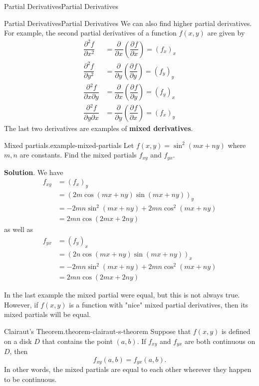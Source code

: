 \documentclass[10pt,]{book}
\newcommand{\terminology}[1]{\textbf{#1}}
\numberwithin{equation}{section}
\newcommand{\pdv}[3][]{\dfrac{\partial^{#1} #2}{\partial #3^{#1}}}
\begin{document}
\begin{chapterptx}{Partial Derivatives}{}{Partial Derivatives}{}{}
\begin{sectionptx}{Partial Derivatives}{}{Partial Derivatives}{}{}
We can also find higher partial derivatives. For example, the second partial derivatives of a function \(f(x,y)\) are given by%
\begin{align*}
\pdv[2]{f}{x} & = \pdv{}{x}\left(\pdv{f}{x}\right) = (f_{x})_{x} \\
\pdv[2]{f}{y} & = \pdv{}{y}\left(\pdv{f}{y}\right) = (f_{y})_{y} \\
\pdv{{}^{2}f}{x\partial y} & = \pdv{}{x}\left(\pdv{f}{y}\right) = (f_{y})_{x} \\
\pdv{{}^{2}f}{y\partial x} & = \pdv{}{y}\left(\pdv{f}{x}\right) = (f_{x})_{y} 
\end{align*}
The last two derivatives are examples of \terminology{mixed derivatives}.%
\begin{example}{Mixed partials.}{example-mixed-partials}%
\hypertarget{p-1145}{}%
Let \(f(x,y) = \sin^{2}(mx+ny)\) where \(m,n\) are constants. Find the mixed partials \(f_{xy}\) and \(f_{yx}\).%
\par\smallskip%
\noindent\textbf{Solution}.\hypertarget{solution-177}{}\quad%
\hypertarget{p-1146}{}%
We have%
\begin{align*}
f_{xy} & = (f_{x})_{y} \\
& = (2m\cos(mx+ny)\sin(mx+ny))_{y} \\
& = -2mn\sin^{2}(mx+ny) + 2mn\cos^{2}(mx+ny) \\
& = 2mn\cos(2mx+2ny) 
\end{align*}
as well as%
\begin{align*}
f_{yx} & = (f_{y})_{x} \\
& = (2n\cos(mx+ny)\sin(mx+ny))_{x} \\
& = -2mn\sin^{2}(mx+ny) + 2mn\cos^{2}(mx+ny) \\
& = 2mn\cos(2mx+2ny) 
\end{align*}
%
\end{example}
\hypertarget{p-1147}{}%
In the last example the mixed partial were equal, but this is not always true. However, if \(f(x,y)\) is a function with "nice" mixed partial derivatives, then its mixed partials will be equal.%
\begin{theorem}{Clairaut's Theorem.}{}{theorem-clairaut-s-theorem}%
\hypertarget{p-1148}{}%
Suppose that \(f(x,y)\) is defined on a disk \(D\) that contains the point \((a,b)\). If \(f_{xy}\) and \(f_{yx}\) are both continuous on \(D\), then%
\begin{equation*}
f_{xy}(a,b) = f_{yx}(a,b).
\end{equation*}
In other words, the mixed partials are equal to each other wherever they happen to be continuous.%

\end{theorem}
\end{sectionptx}
\end{chapterptx}
\end{document}

